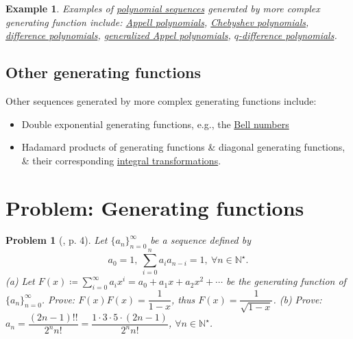\documentclass[oneside]{book}
\newtheorem{example}{Example}
\newtheorem{problem}{Problem}
\begin{document}
\begin{example}
	Examples of \href{https://en.wikipedia.org/wiki/Polynomial_sequence}{polynomial sequences} generated by more complex generating function include: \href{https://en.wikipedia.org/wiki/Appell_polynomials}{Appell polynomials}, \href{https://en.wikipedia.org/wiki/Chebyshev_polynomials}{Chebyshev polynomials}, \href{https://en.wikipedia.org/wiki/Difference_polynomials}{difference polynomials}, \href{https://en.wikipedia.org/wiki/Generalized_Appell_polynomials}{generalized Appel polynomials}, \href{https://en.wikipedia.org/wiki/Q-difference_polynomial}{$q$-difference polynomials}.
\end{example}


\subsection{Other generating functions}
Other sequences generated by more complex generating functions include:
\begin{itemize}
	\item Double exponential generating functions, e.g., the \href{https://en.wikipedia.org/wiki/Bell_numbers#Generating_function}{Bell numbers}
	\item Hadamard products of generating functions \& diagonal generating functions, \& their corresponding \href{https://en.wikipedia.org/wiki/Generating_function_transformation#Hadamard_products_and_diagonal_generating_functions}{integral transformations}.
\end{itemize}



\section{Problem: Generating functions}

\begin{problem}[\cite{Shahriari2022}, p. 4]
	Let $\{a_n\}_{n=0}^\infty$ be a sequence defined by
	\begin{equation*}
		a_0 = 1,\ \sum_{i=0}^n a_ia_{n-i} = 1,\ \forall n\in\mathbb{N}^\star.
	\end{equation*}
	(a) Let $F(x)\coloneqq\sum_{i=0}^\infty a_ix^i = a_0 + a_1x + a_2x^2 + \cdots$ be the generating function of $\{a_n\}_{n=0}^\infty$. Prove: $F(x)F(x) = \dfrac{1}{1 - x}$, thus $F(x) = \dfrac{1}{\sqrt{1 - x}}$. (b) Prove: $a_n = \dfrac{(2n - 1)!!}{2^nn!} = \dfrac{1\cdot3\cdot5\cdot(2n - 1)}{2^nn!}$, $\forall n\in\mathbb{N}^\star$.
\end{problem}
\end{document}
